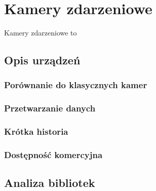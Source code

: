 \chapter{Kamery zdarzeniowe}

Kamery zdarzeniowe to \cite{EventCameras}
\section{Opis urządzeń}

    \subsection{Porównanie do klasycznych kamer}
    \subsection{Przetwarzanie danych}
    \subsection{Krótka historia}
    \subsection{Dostępność komercyjna}

\section{Analiza bibliotek}
